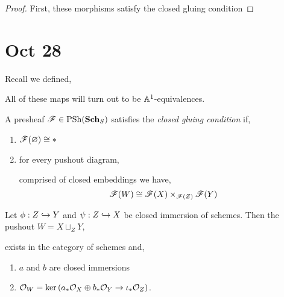 \documentclass[12pt]{article}
\begin{document}
\begin{proof}
First, these morphisms satisfy the closed gluing condition
\end{proof}

\section{Oct 28}

\newcommand{\Gr}{\mathrm{Gr}}

Recall we defined,
\begin{center}
\end{center}
All of these maps will turn out to be $\mathbb{A}^1$-equivalences. 

\begin{defn}
A presheaf $\mathscr{F} \in \mathrm{PSh}(\mathbf{Sch}_S)$ satisfies the \textit{closed gluing condition} if,
\begin{enumerate}
\item $\mathscr{F}(\varnothing) \cong *$
\item for every pushout diagram,
\begin{center}
\end{center}
comprised of closed embeddings we have,
\[ \mathscr{F}(W) \cong \mathscr{F}(X) \times_{\mathscr{F}(Z)} \mathscr{F}(Y) \]
\end{enumerate}
\end{defn}

\begin{prop}
Let $\phi : Z \hookrightarrow Y$ and $\psi : Z \hookrightarrow X$ be closed immersion of schemes. Then the pushout $W = X \sqcup_{Z} Y$,
\begin{center}
\end{center} 
exists in the category of schemes and,
\begin{enumerate}
\item $a$ and $b$ are closed immersions
\item $\mathcal{O}_{W} = \ker{(a_* \mathcal{O}_{X} \oplus b_* \mathcal{O}_{Y} \to \iota_* \mathcal{O}_{Z})}$.
\end{enumerate}
\end{prop}
\end{document}
